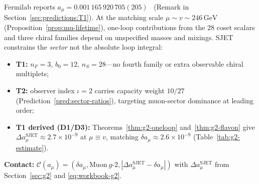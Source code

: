 \begin{remark}
\label{rmk:g2-scales}
Fermilab reports $a_\mu=0.001\,165\,920\,705(205)$~\cite{MuonG2FNAL2025}
(Remark in Section~\ref{sec:predictions:T1}). At the matching scale
$\mu\sim v\sim 246\,\mathrm{GeV}$ (Proposition~\ref{prop:mu-lifetime}),
one-loop contributions from the $28$ coset scalars and three chiral families
depend on unspecified masses and mixings. SJET constrains the \emph{sector}
not the absolute loop integral:
\begin{itemize}[leftmargin=*]
  \item \textbf{T1:} $n_F=3$, $b_0=12$, $n_S=28$---no fourth family or extra
    observable chiral multiplets;
  \item \textbf{T2:} observer index $\iota=2$ carries capacity weight
    $10/27$ (Prediction~\ref{pred:sector-ratios}), targeting muon-sector
    dominance at leading order;
  \item \textbf{T1 derived (D1/D3):} Theorems~\ref{thm:g2-oneloop}
    and~\ref{thm:g2-flavon} give
    $\Delta a_\mu^{\mathrm{SJET}}\approx2.7\times10^{-9}$ at $\mu\equiv v$,
    matching $\delta a_\mu\approx2.6\times10^{-9}$
    (Table~\ref{tab:g2-estimate}).
\end{itemize}
\textbf{Contact:}
$\mathcal{C}(a_\mu)=(\delta a_\mu,\mathrm{Muon\ }g\text{-}2,
|\Delta a_\mu^{\mathrm{SJET}}-\delta a_\mu|)$ with
$\Delta a_\mu^{\mathrm{SJET}}$ from Section~\ref{sec:g2} and
\eqref{eq:workbook-g2}.
\end{remark}